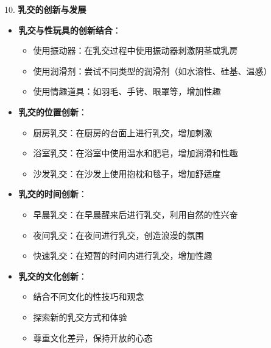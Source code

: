 \documentclass[12pt,UTF8]{ctexbook}
\begin{document}
10. \textbf{乳交的创新与发展}
\begin{itemize}
	\item \textbf{乳交与性玩具的创新结合}：
	\begin{itemize}
		\item 使用振动器：在乳交过程中使用振动器刺激阴茎或乳房
		\item 使用润滑剂：尝试不同类型的润滑剂（如水溶性、硅基、温感）
		\item 使用情趣道具：如羽毛、手铐、眼罩等，增加性趣
	\end{itemize}
	\item \textbf{乳交的位置创新}：
	\begin{itemize}
		\item 厨房乳交：在厨房的台面上进行乳交，增加刺激
		\item 浴室乳交：在浴室中使用温水和肥皂，增加润滑和性趣
		\item 沙发乳交：在沙发上使用抱枕和毯子，增加舒适度
	\end{itemize}
	\item \textbf{乳交的时间创新}：
	\begin{itemize}
		\item 早晨乳交：在早晨醒来后进行乳交，利用自然的性兴奋
		\item 夜间乳交：在夜间进行乳交，创造浪漫的氛围
		\item 快速乳交：在短暂的时间内进行乳交，增加性趣
	\end{itemize}
	\item \textbf{乳交的文化创新}：
	\begin{itemize}
		\item 结合不同文化的性技巧和观念
		\item 探索新的乳交方式和体验
		\item 尊重文化差异，保持开放的心态
	\end{itemize}
\end{itemize}
\end{document}
